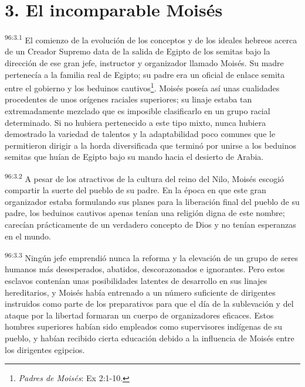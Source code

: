 \section*{3. El incomparable Moisés}
\par
\textsuperscript{96:3.1} El comienzo de la evolución de los conceptos y de los ideales hebreos acerca de un Creador Supremo data de la salida de Egipto de los semitas bajo la dirección de ese gran jefe, instructor y organizador llamado Moisés. Su madre pertenecía a la familia real de Egipto; su padre era un oficial de enlace semita entre el gobierno y los beduinos cautivos\footnote{\textit{Padres de Moisés}: Ex 2:1-10.}. Moisés poseía así unas cualidades procedentes de unos orígenes raciales superiores; su linaje estaba tan extremadamente mezclado que es imposible clasificarlo en un grupo racial determinado. Si no hubiera pertenecido a este tipo mixto, nunca hubiera demostrado la variedad de talentos y la adaptabilidad poco comunes que le permitieron dirigir a la horda diversificada que terminó por unirse a los beduinos semitas que huían de Egipto bajo su mando hacia el desierto de Arabia.

\par
\textsuperscript{96:3.2} A pesar de los atractivos de la cultura del reino del Nilo, Moisés escogió compartir la suerte del pueblo de su padre. En la época en que este gran organizador estaba formulando sus planes para la liberación final del pueblo de su padre, los beduinos cautivos apenas tenían una religión digna de este nombre; carecían prácticamente de un verdadero concepto de Dios y no tenían esperanzas en el mundo.

\par
\textsuperscript{96:3.3} Ningún jefe emprendió nunca la reforma y la elevación de un grupo de seres humanos más desesperados, abatidos, descorazonados e ignorantes. Pero estos esclavos contenían unas posibilidades latentes de desarrollo en sus linajes hereditarios, y Moisés había entrenado a un número suficiente de dirigentes instruidos como parte de los preparativos para que el día de la sublevación y del ataque por la libertad formaran un cuerpo de organizadores eficaces. Estos hombres superiores habían sido empleados como supervisores indígenas de su pueblo, y habían recibido cierta educación debido a la influencia de Moisés entre los dirigentes egipcios.

